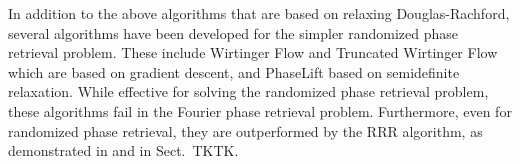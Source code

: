\documentclass[journal]{IEEEtran}
\theoremstyle{definition}
\theoremstyle{remark}
\theoremstyle{definition}
\theoremstyle{problem}
\theoremstyle{definition}
\newcommand{\MM}{\mathcal{M}}
\newcommand{\TODO}[1]{{\color{red}{[#1]}}}
\begin{document}
In addition to the above algorithms that are based on relaxing Douglas-Rachford, several algorithms have been developed for the simpler randomized phase retrieval problem. These include Wirtinger Flow and Truncated Wirtinger Flow which are based on gradient descent, and PhaseLift based on semidefinite relaxation. While effective for solving the randomized phase retrieval problem, these algorithms fail in the Fourier phase retrieval problem. Furthermore, even for randomized phase retrieval, they are outperformed by the RRR algorithm, as demonstrated in \TODO{benchmarks} and in Sect.~TKTK. 
%
%
\end{document}

